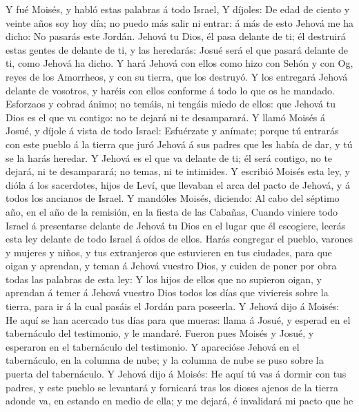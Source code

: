  Y fué Moisés, y habló estas palabras á todo Israel,
 Y díjoles: De edad de ciento y veinte años soy hoy día;
no puedo más salir ni entrar: á más de esto Jehová me ha dicho: No
pasarás este Jordán.  Jehová tu Dios, él pasa delante de
ti; él destruirá estas gentes de delante de ti, y las heredarás: Josué
será el que pasará delante de ti, como Jehová ha dicho.  Y
hará Jehová con ellos como hizo con Sehón y con Og, reyes de los
Amorrheos, y con su tierra, que los destruyó.  Y los
entregará Jehová delante de vosotros, y haréis con ellos conforme á todo
lo que os he mandado.  Esforzaos y cobrad ánimo; no
temáis, ni tengáis miedo de ellos: que Jehová tu Dios es el que va
contigo: no te dejará ni te desamparará.  Y llamó Moisés á
Josué, y díjole á vista de todo Israel: Esfuérzate y anímate; porque tú
entrarás con este pueblo á la tierra que juró Jehová á sus padres que
les había de dar, y tú se la harás heredar.  Y Jehová es
el que va delante de ti; él será contigo, no te dejará, ni te
desamparará; no temas, ni te intimides.  Y escribió Moisés
esta ley, y dióla á los sacerdotes, hijos de Leví, que llevaban el arca
del pacto de Jehová, y á todos los ancianos de Israel.  Y
mandóles Moisés, diciendo: Al cabo del séptimo año, en el año de la
remisión, en la fiesta de las Cabañas,  Cuando viniere
todo Israel á presentarse delante de Jehová tu Dios en el lugar que él
escogiere, leerás esta ley delante de todo Israel á oídos de ellos.
 Harás congregar el pueblo, varones y mujeres y niños, y
tus extranjeros que estuvieren en tus ciudades, para que oigan y
aprendan, y teman á Jehová vuestro Dios, y cuiden de poner por obra
todas las palabras de esta ley:  Y los hijos de ellos que
no supieron oigan, y aprendan á temer á Jehová vuestro Dios todos los
días que viviereis sobre la tierra, para ir á la cual pasáis el Jordán
para poseerla.  Y Jehová dijo á Moisés: He aquí se han
acercado tus días para que mueras: llama á Josué, y esperad en el
tabernáculo del testimonio, y le mandaré. Fueron pues Moisés y Josué, y
esperaron en el tabernáculo del testimonio.  Y aparecióse
Jehová en el tabernáculo, en la columna de nube; y la columna de nube se
puso sobre la puerta del tabernáculo.  Y Jehová dijo á
Moisés: He aquí tú vas á dormir con tus padres, y este pueblo se
levantará y fornicará tras los dioses ajenos de la tierra adonde va, en
estando en medio de ella; y me dejará, é invalidará mi pacto que he

